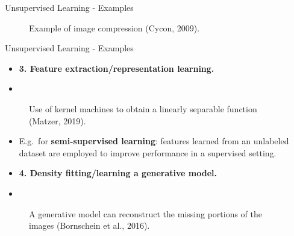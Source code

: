 \begin{vbframe}{Unsupervised Learning - Examples}
    \begin{figure}
        \caption{Example of image compression (Cycon, 2009).}
    \end{figure}

\end{vbframe}



\begin{vbframe} {Unsupervised Learning - Examples}
  \begin{itemize}
    \item[] \textbf{3. Feature extraction/representation learning.}
    \item[]
  \end{itemize}
   \begin{figure}
        \caption{Use of kernel machines to obtain a linearly separable function (Matzer, 2019).}
    \end{figure}
    \begin{itemize}
    \item  E.g.~for \textbf{semi-supervised learning}: features learned from an unlabeled dataset are employed to improve performance in a supervised setting. 
    \end{itemize}
\framebreak
  \begin{itemize}
    \item[] \textbf{4. Density fitting/learning a generative model.}
    \item[]
  \end{itemize}
   \begin{figure}
        \caption{A generative model can reconstruct the missing portions of the images (Bornschein et al., 2016).}
    \end{figure}
    


\end{vbframe}
